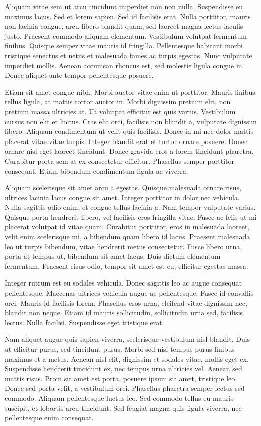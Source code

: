 \documentclass[10pt, a4paper]{article}
\theoremstyle{theorem-style}
\theoremstyle{definition-style}
\theoremstyle{remark-style}
\theoremstyle{example-style}
\theoremstyle{definition-style}
\theoremstyle{remark-style}
\begin{document}
Aliquam vitae sem ut arcu tincidunt imperdiet non non nulla. Suspendisse eu maximus lacus. Sed et lorem sapien. Sed id facilisis erat. Nulla porttitor, mauris non lacinia congue, arcu libero blandit quam, sed laoreet magna lectus iaculis justo. Praesent commodo aliquam elementum. Vestibulum volutpat fermentum finibus. Quisque semper vitae mauris id fringilla. Pellentesque habitant morbi tristique senectus et netus et malesuada fames ac turpis egestas. Nunc vulputate imperdiet mollis. Aenean accumsan rhoncus est, sed molestie ligula congue in. Donec aliquet ante tempor pellentesque posuere.

Etiam sit amet congue nibh. Morbi auctor vitae enim ut porttitor. Mauris finibus tellus ligula, at mattis tortor auctor in. Morbi dignissim pretium elit, non pretium massa ultricies at. Ut volutpat efficitur est quis varius. Vestibulum cursus non elit et luctus. Cras elit orci, facilisis non blandit a, vulputate dignissim libero. Aliquam condimentum ut velit quis facilisis. Donec in mi nec dolor mattis placerat vitae vitae turpis. Integer blandit erat et tortor ornare posuere. Donec ornare nisl eget laoreet tincidunt. Donec gravida eros a lorem tincidunt pharetra. Curabitur porta sem at ex consectetur efficitur. Phasellus semper porttitor consequat. Etiam bibendum condimentum ligula ac viverra.

Aliquam scelerisque sit amet arcu a egestas. Quisque malesuada ornare risus, ultrices lacinia lacus congue sit amet. Integer porttitor in dolor nec vehicula. Nulla sagittis odio enim, et congue tellus lacinia a. Nam tempor vulputate varius. Quisque porta hendrerit libero, vel facilisis eros fringilla vitae. Fusce ac felis ut mi placerat volutpat id vitae quam. Curabitur porttitor, eros in malesuada laoreet, velit enim scelerisque mi, a bibendum quam libero id lacus. Praesent malesuada leo ut turpis bibendum, vitae hendrerit metus consectetur. Fusce libero urna, porta at tempus ut, bibendum sit amet lacus. Duis dictum elementum fermentum. Praesent risus odio, tempor sit amet est eu, efficitur egestas massa.

Integer rutrum est eu sodales vehicula. Donec sagittis leo ac augue consequat pellentesque. Maecenas ultrices vehicula augue ac pellentesque. Fusce id convallis orci. Mauris id facilisis lorem. Phasellus eros urna, eleifend vitae dignissim nec, blandit non neque. Etiam id mauris sollicitudin, sollicitudin urna sed, facilisis lectus. Nulla facilisi. Suspendisse eget tristique erat.

Nam aliquet augue quis sapien viverra, scelerisque vestibulum nisl blandit. Duis ut efficitur purus, sed tincidunt purus. Morbi sed nisi tempus purus finibus maximus et a metus. Aenean nisl elit, dignissim et sodales vitae, mollis eget ex. Suspendisse hendrerit tincidunt ex, nec tempus urna ultricies vel. Aenean sed mattis risus. Proin sit amet est porta, posuere ipsum sit amet, tristique leo. Donec sed porta velit, a vestibulum orci. Phasellus pharetra semper lectus sed commodo. Aliquam pellentesque luctus leo. Sed commodo tellus eu mauris suscipit, et lobortis arcu tincidunt. Sed feugiat magna quis ligula viverra, nec pellentesque enim consequat.
\end{document}
